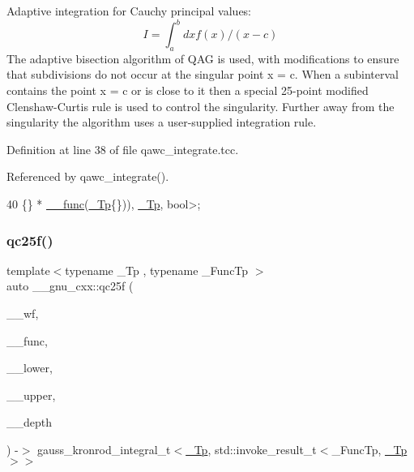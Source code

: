 Adaptive integration for Cauchy principal values\+: \[ I = \int_a^b dx f(x) / (x - c) \] The adaptive bisection algorithm of Q\+AG is used, with modifications to ensure that subdivisions do not occur at the singular point x = c. When a subinterval contains the point x = c or is close to it then a special 25-\/point modified Clenshaw-\/\+Curtis rule is used to control the singularity. Further away from the singularity the algorithm uses a user-\/supplied integration rule. 

Definition at line 38 of file qawc\+\_\+integrate.\+tcc.



Referenced by qawc\+\_\+integrate().


\begin{DoxyCode}
40                             \{\} * \hyperlink{namespace____gnu__cxx_af2b2f0c7a2ae72b922b1afefae5a65b2}{\_\_func}(\hyperlink{namespace____gnu__cxx_a3b19a9c800ca194374ef9172290f7d79}{\_Tp}\{\})), \hyperlink{namespace____gnu__cxx_a3b19a9c800ca194374ef9172290f7d79}{\_Tp}, \textcolor{keywordtype}{bool}>;
\end{DoxyCode}
\mbox{\label{namespace____gnu__cxx_a1362a6c4ef82cf1afe4de6bc66fb56b6}} 
\subsubsection{\texorpdfstring{qc25f()}{qc25f()}}
{\footnotesize\ttfamily template$<$typename \+\_\+\+Tp , typename \+\_\+\+Func\+Tp $>$ \\
auto \+\_\+\+\_\+gnu\+\_\+cxx\+::qc25f (\begin{DoxyParamCaption}\item[{\hyperlink{struct____gnu__cxx_1_1oscillatory__integration__table}{oscillatory\+\_\+integration\+\_\+table}$<$ \hyperlink{namespace____gnu__cxx_a3b19a9c800ca194374ef9172290f7d79}{\+\_\+\+Tp} $>$ \&}]{\+\_\+\+\_\+wf,  }\item[{\+\_\+\+Func\+Tp}]{\+\_\+\+\_\+func,  }\item[{\hyperlink{namespace____gnu__cxx_a3b19a9c800ca194374ef9172290f7d79}{\+\_\+\+Tp}}]{\+\_\+\+\_\+lower,  }\item[{\hyperlink{namespace____gnu__cxx_a3b19a9c800ca194374ef9172290f7d79}{\+\_\+\+Tp}}]{\+\_\+\+\_\+upper,  }\item[{std\+::size\+\_\+t}]{\+\_\+\+\_\+depth }\end{DoxyParamCaption}) -\/$>$ gauss\+\_\+kronrod\+\_\+integral\+\_\+t$<$\hyperlink{namespace____gnu__cxx_a3b19a9c800ca194374ef9172290f7d79}{\+\_\+\+Tp}, std\+::invoke\+\_\+result\+\_\+t$<$\+\_\+\+Func\+Tp, \hyperlink{namespace____gnu__cxx_a3b19a9c800ca194374ef9172290f7d79}{\+\_\+\+Tp}$>$$>$}



